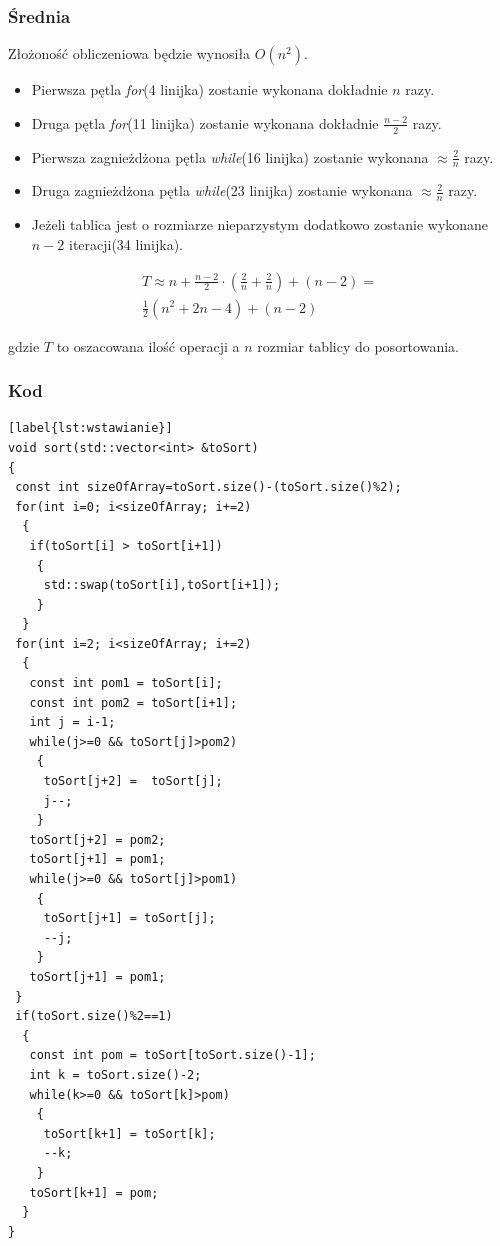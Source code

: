 \subsubsection*{Średnia}
Złożoność obliczeniowa będzie wynosiła $O(n^2)$.
\begin{itemize}
\item Pierwsza pętla \textit{for}(4 linijka) zostanie wykonana dokładnie $n$ razy.
\item Druga pętla \textit{for}(11 linijka) zostanie wykonana dokładnie $\frac{n-2}{2}$ razy.
\item Pierwsza zagnieżdżona pętla \textit{while}(16 linijka) zostanie wykonana $\approx \frac{2}{n}$ razy.
\item Druga zagnieżdżona pętla \textit{while}(23 linijka) zostanie wykonana $\approx \frac{2}{n}$ razy.
\item Jeżeli tablica jest o rozmiarze nieparzystym dodatkowo zostanie wykonane $n-2$ iteracji(34 linijka).
\end{itemize}
\begin{equation*}
\begin{multlined}
T \approx n + \frac{n-2}{2}\cdot(\frac{2}{n} + \frac{2}{n})+ (n-2)=\\
\frac{1}{2}(n^2 + 2n -4)+ (n-2)
\end{multlined}
\end{equation*}

gdzie $T$ to oszacowana ilość operacji a $n$ rozmiar tablicy do posortowania.\\
\subsubsection*{Kod}
\begin{lstlisting}[label{lst:wstawianie}]
void sort(std::vector<int> &toSort)
{
 const int sizeOfArray=toSort.size()-(toSort.size()%2);
 for(int i=0; i<sizeOfArray; i+=2)
  {
   if(toSort[i] > toSort[i+1])
    {
     std::swap(toSort[i],toSort[i+1]);
    }
  }
 for(int i=2; i<sizeOfArray; i+=2)
  {
   const int pom1 = toSort[i];
   const int pom2 = toSort[i+1];
   int j = i-1;
   while(j>=0 && toSort[j]>pom2)
    {
     toSort[j+2] =  toSort[j];
     j--;
    }
   toSort[j+2] = pom2;
   toSort[j+1] = pom1;
   while(j>=0 && toSort[j]>pom1)
    {
     toSort[j+1] = toSort[j];
     --j;
    }
   toSort[j+1] = pom1;
 }
 if(toSort.size()%2==1)
  {
   const int pom = toSort[toSort.size()-1];
   int k = toSort.size()-2;
   while(k>=0 && toSort[k]>pom)
    {
     toSort[k+1] = toSort[k];
     --k;
    }
   toSort[k+1] = pom;
  }
}
\end{lstlisting}

